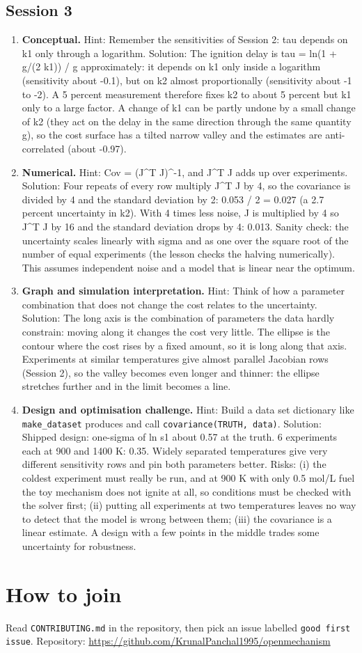 \documentclass[11pt,a4paper]{article}
\begin{document}
\subsection*{Session 3}
\begin{enumerate}[nosep]
\item \textbf{Conceptual.} Hint: Remember the sensitivities of Session 2: tau depends on k1 only through a logarithm. Solution: The ignition delay is tau = ln(1 + g/(2 k1)) / g approximately: it depends on k1 only inside a logarithm (sensitivity about -0.1), but on k2 almost proportionally (sensitivity about -1 to -2). A 5 percent measurement therefore fixes k2 to about 5 percent but k1 only to a large factor. A change of k1 can be partly undone by a small change of k2 (they act on the delay in the same direction through the same quantity g), so the cost surface has a tilted narrow valley and the estimates are anti-correlated (about -0.97).
\item \textbf{Numerical.} Hint: Cov = (J\textasciicircum{}T J)\textasciicircum{}-1, and J\textasciicircum{}T J adds up over experiments. Solution: Four repeats of every row multiply J\textasciicircum{}T J by 4, so the covariance is divided by 4 and the standard deviation by 2: 0.053 / 2 = 0.027 (a 2.7 percent uncertainty in k2). With 4 times less noise, J is multiplied by 4 so J\textasciicircum{}T J by 16 and the standard deviation drops by 4: 0.013. Sanity check: the uncertainty scales linearly with sigma and as one over the square root of the number of equal experiments (the lesson checks the halving numerically). This assumes independent noise and a model that is linear near the optimum.
\item \textbf{Graph and simulation interpretation.} Hint: Think of how a parameter combination that does not change the cost relates to the uncertainty. Solution: The long axis is the combination of parameters the data hardly constrain: moving along it changes the cost very little. The ellipse is the contour where the cost rises by a fixed amount, so it is long along that axis. Experiments at similar temperatures give almost parallel Jacobian rows (Session 2), so the valley becomes even longer and thinner: the ellipse stretches further and in the limit becomes a line.
\item \textbf{Design and optimisation challenge.} Hint: Build a data set dictionary like \texttt{make\_dataset} produces and call \texttt{covariance(TRUTH, data)}. Solution: Shipped design: one-sigma of ln s1 about 0.57 at the truth. 6 experiments each at 900 and 1400 K: 0.35. Widely separated temperatures give very different sensitivity rows and pin both parameters better. Risks: (i) the coldest experiment must really be run, and at 900 K with only 0.5 mol/L fuel the toy mechanism does not ignite at all, so conditions must be checked with the solver first; (ii) putting all experiments at two temperatures leaves no way to detect that the model is wrong between them; (iii) the covariance is a linear estimate. A design with a few points in the middle trades some uncertainty for robustness.
\end{enumerate}

\section{How to join}
Read \texttt{CONTRIBUTING.md} in the repository, then pick an issue labelled \texttt{good first issue}. Repository: \url{https://github.com/KrunalPanchal1995/openmechanism}
\end{document}
